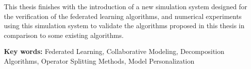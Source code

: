 This thesis finishes with the introduction of a new simulation system designed for the verification of the federated learning algorithms, and numerical experiments using this simulation system to validate the algorithms proposed in this thesis in comparison to some existing algorithms.

\par
\bigskip

{\bf Key words:} Federated Learning, Collaborative Modeling, Decomposition Algorithms, Operator Splitting Methods, Model Personalization

\newpage
~~~\vspace{1em}
\thispagestyle{empty}

